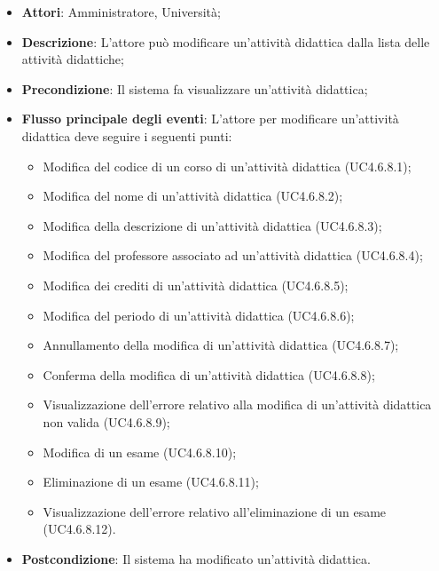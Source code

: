 \begin{itemize}
	\item \textbf{Attori}: Amministratore, Università;
	\item \textbf{Descrizione}: L'attore può modificare un’attività didattica dalla lista delle attività didattiche;
	
	\item \textbf{Precondizione}: Il sistema fa visualizzare un'attività didattica;
	
	\item \textbf{Flusso principale degli eventi}: L'attore per modificare un’attività didattica deve seguire i seguenti punti:
	
	\begin{itemize}
		\item Modifica del codice di un corso di un'attività didattica (UC4.6.8.1);
		\item Modifica del nome di un'attività didattica (UC4.6.8.2);
		\item Modifica della descrizione di un'attività didattica (UC4.6.8.3);
		\item Modifica del professore associato ad un'attività didattica (UC4.6.8.4);
		\item Modifica dei crediti di un'attività didattica (UC4.6.8.5);
		\item Modifica del periodo di un'attività didattica (UC4.6.8.6);
		\item Annullamento della modifica di un'attività didattica (UC4.6.8.7);
		\item Conferma della modifica di un'attività didattica (UC4.6.8.8);
		\item Visualizzazione dell'errore relativo alla modifica di un’attività didattica non valida (UC4.6.8.9);
		\item Modifica di un esame (UC4.6.8.10);
		\item Eliminazione di un esame (UC4.6.8.11);
		\item Visualizzazione dell'errore relativo all'eliminazione di un esame (UC4.6.8.12).
	\end{itemize}
	\item \textbf{Postcondizione}: Il sistema ha modificato un’attività didattica.
	
\end{itemize}
